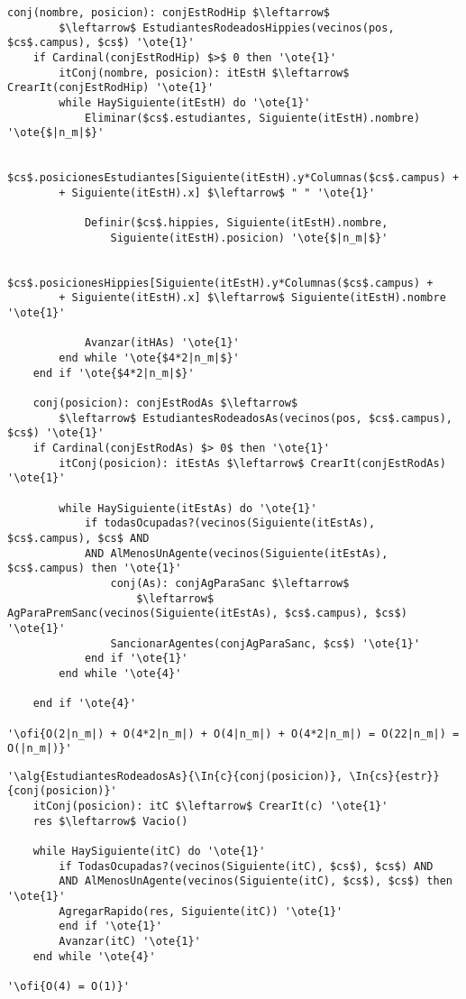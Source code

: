 \begin{lstlisting}[mathescape]
	conj(nombre, posicion): conjEstRodHip $\leftarrow$
		$\leftarrow$ EstudiantesRodeadosHippies(vecinos(pos, $cs$.campus), $cs$) '\ote{1}'
	if Cardinal(conjEstRodHip) $>$ 0 then '\ote{1}'
		itConj(nombre, posicion): itEstH $\leftarrow$ CrearIt(conjEstRodHip) '\ote{1}'	
		while HaySiguiente(itEstH) do '\ote{1}'
			Eliminar($cs$.estudiantes, Siguiente(itEstH).nombre) '\ote{$|n_m|$}'
			
			$cs$.posicionesEstudiantes[Siguiente(itEstH).y*Columnas($cs$.campus) +
		+ Siguiente(itEstH).x] $\leftarrow$ " " '\ote{1}'

			Definir($cs$.hippies, Siguiente(itEstH).nombre, 
				Siguiente(itEstH).posicion) '\ote{$|n_m|$}'
			
			$cs$.posicionesHippies[Siguiente(itEstH).y*Columnas($cs$.campus) +
		+ Siguiente(itEstH).x] $\leftarrow$ Siguiente(itEstH).nombre '\ote{1}'
		
			Avanzar(itHAs) '\ote{1}'
		end while '\ote{$4*2|n_m|$}'
	end if '\ote{$4*2|n_m|$}'

	conj(posicion): conjEstRodAs $\leftarrow$
		$\leftarrow$ EstudiantesRodeadosAs(vecinos(pos, $cs$.campus), $cs$) '\ote{1}'
	if Cardinal(conjEstRodAs) $> 0$ then '\ote{1}'
		itConj(posicion): itEstAs $\leftarrow$ CrearIt(conjEstRodAs) '\ote{1}'
		
		while HaySiguiente(itEstAs) do '\ote{1}'
			if todasOcupadas?(vecinos(Siguiente(itEstAs), $cs$.campus), $cs$ AND 
			AND AlMenosUnAgente(vecinos(Siguiente(itEstAs), $cs$.campus) then '\ote{1}'
				conj(As): conjAgParaSanc $\leftarrow$ 
					$\leftarrow$ AgParaPremSanc(vecinos(Siguiente(itEstAs), $cs$.campus), $cs$) '\ote{1}'
				SancionarAgentes(conjAgParaSanc, $cs$) '\ote{1}'
			end if '\ote{1}'
		end while '\ote{4}'

	end if '\ote{4}'

'\ofi{O(2|n_m|) + O(4*2|n_m|) + O(4|n_m|) + O(4*2|n_m|) = O(22|n_m|) = O(|n_m|)}'
\end{lstlisting}

\begin{lstlisting}[mathescape]
'\alg{EstudiantesRodeadosAs}{\In{c}{conj(posicion)}, \In{cs}{estr}}{conj(posicion)}'
	itConj(posicion): itC $\leftarrow$ CrearIt(c) '\ote{1}'
	res $\leftarrow$ Vacio()

	while HaySiguiente(itC) do '\ote{1}'
		if TodasOcupadas?(vecinos(Siguiente(itC), $cs$), $cs$) AND
		AND AlMenosUnAgente(vecinos(Siguiente(itC), $cs$), $cs$) then '\ote{1}'
		AgregarRapido(res, Siguiente(itC)) '\ote{1}'
		end if '\ote{1}'
		Avanzar(itC) '\ote{1}'
	end while '\ote{4}'

'\ofi{O(4) = O(1)}'
\end{lstlisting}


